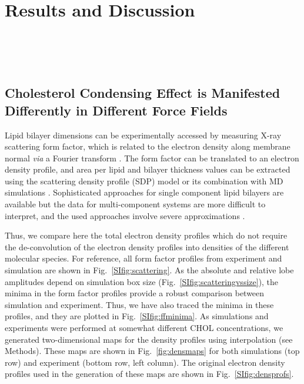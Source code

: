 \documentclass[aps,prl,superscriptaddress]{revtex4-2}
\begin{document}
\section{Results and Discussion}

\\
\\
\\

\subsection{Cholesterol Condensing Effect is Manifested Differently in Different Force Fields}

Lipid bilayer dimensions can be experimentally accessed by measuring X-ray scattering form factor, which is related to the electron density along membrane normal \textit{via} a Fourier transform \cite{pan12,Heftberger15,Marquardt15,ollila16,??}. The form factor can be translated to an electron density profile, and area per lipid and bilayer thickness values can be extracted using the scattering density profile (SDP) model or its combination with MD simulations  \cite{pan12,Heftberger15,Marquardt15,??,doktorova2020molecular}. Sophisticated approaches for single component lipid bilayers are available but the data for multi-component systems are more difficult to interpret, and the used approaches involve severe approximations \cite{pan12,Heftberger15,Marquardt15,??}. 

Thus, we compare here the total electron density profiles which do not require the de-convolution of the electron density profiles into densities of the different molecular species. For reference, all form factor profiles from experiment and simulation are shown in Fig.~\ref{SIfig:scattering}. As the absolute and relative lobe amplitudes depend on simulation box size (Fig.~\ref{SIfig:scatteringvssize}), the minima in the form factor profiles provide a robust comparison between simulation and experiment. Thus, we have also traced the minima in these profiles, and they are plotted in Fig.~\ref{SIfig:ffminima}. As simulations and experiments were performed at somewhat different CHOL concentrations, we generated two-dimensional maps for the density profiles using interpolation (see Methods). These maps are shown in Fig.~\ref{fig:densmaps} for both simulations (top row) and experiment (bottom row, left column). The original electron density profiles used in the generation of these maps are shown in Fig.~\ref{SIfig:densprofs}.
\end{document}

